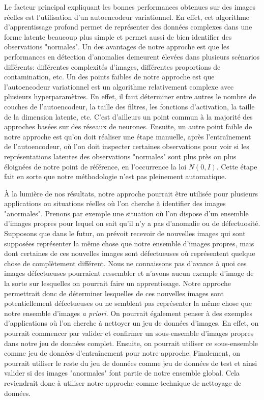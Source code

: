  Le facteur principal expliquant les bonnes performances obtenues sur des images réelles est l'utilisation d'un autoencodeur variationnel. En effet, cet algorithme d'apprentissage profond permet de représenter des données complexes dans une forme latente beaucoup plus simple et permet aussi de bien identifier des observations "normales". Un des avantages de notre approche est que les performances en détection d'anomalies demeurent élevées dans plusieurs scénarios différents: différentes complexités d'images, différentes proportions de contamination, etc. Un des points faibles de notre approche est que l'autoencodeur variationnel est un algorithme relativement complexe avec plusieurs hyperparamètres. En effet, il faut déterminer entre autres le nombre de couches de l'autoencodeur, la taille des filtres, les fonctions d'activation, la taille de la dimension latente, etc. C'est d'ailleurs un point commun à la majorité des approches basées sur des réseaux de neurones. Ensuite, un autre point faible de notre approche est qu'on doit réaliser une étape manuelle, après l'entraînement de l'autoencodeur, où l'on doit inspecter certaines observations pour voir si les représentations latentes des observations "normales" sont plus près ou plus éloignées de notre point de référence, en l'occurrence la loi $N(0,I)$. Cette étape fait en sorte que notre méthodologie n'est pas pleinement automatique.
 
À la lumière de nos résultats, notre approche pourrait être utilisée pour plusieurs applications ou situations réelles où l'on cherche à identifier des images "anormales". Prenons par exemple une situation où l'on dispose d'un ensemble d'images propres pour lequel on sait qu'il n'y a pas d'anomalie ou de défectuosité. Supposons que dans le futur, on prévoit recevoir de nouvelles images qui sont supposées représenter la même chose que notre ensemble d'images propres, mais dont certaines de ces nouvelles images sont défectueuses où représentent quelque chose de complètement différent. Nous ne connaissons pas d'avance à quoi ces images défectueuses pourraient ressembler et n'avons aucun exemple d'image de la sorte sur lesquelles on pourrait faire un apprentissage. Notre approche permettrait donc de déterminer lesquelles de ces nouvelles images sont potentiellement défectueuses ou ne semblent pas représenter la même chose que notre ensemble d'images \textit{a priori}. On pourrait également penser à des exemples d'applications où l'on cherche à nettoyer un jeu de données d'images. En effet, on pourrait commencer par valider et confirmer un sous-ensemble d'images propres dans notre jeu de données complet. Ensuite, on pourrait utiliser ce sous-ensemble comme jeu de données d'entraînement pour notre approche. Finalement, on pourrait utiliser le reste du jeu de données comme jeu de données de test et ainsi valider si des images "anormales" font partie de notre ensemble global. Cela reviendrait donc à utiliser notre approche comme technique de nettoyage de données.

